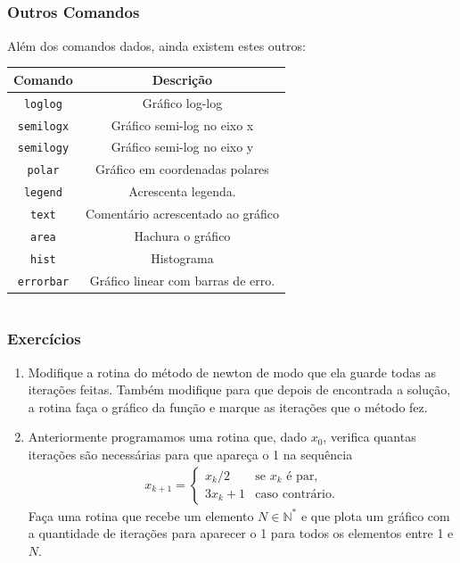 \documentclass{beamer}
\begin{document}
\subsection[Outros Comandos]{}
\begin{frame}
\frametitle{Outros Comandos}
Al\'em dos comandos dados, ainda existem estes outros:
\begin{center}
\begin{tabular}{|c|c|}
\hline
Comando & Descri\c{c}\~ao \\ \hline
{\tt loglog} & Gr\'afico log-log \\ \hline
{\tt semilogx} & Gr\'afico semi-log no eixo x \\ \hline
{\tt semilogy} & Gr\'afico semi-log no eixo y \\ \hline
{\tt polar} & Gr\'afico em coordenadas polares \\ \hline
{\tt legend} & Acrescenta legenda. \\ \hline
{\tt text} & Coment\'ario acrescentado ao gr\'afico \\ \hline
{\tt area} & Hachura o gr\'afico \\ \hline
{\tt hist} & Histograma \\ \hline
{\tt errorbar} & Gr\'afico linear com barras de erro. \\ \hline
\end{tabular}
\end{center}
\end{frame}

\section[Exerc\'icios]{}

\begin{frame}
\frametitle{Exerc\'icios}

\begin{enumerate}
 \item Modifique a rotina do m\'etodo de newton de modo que ela guarde todas as itera\c{c}\~oes feitas. Tamb\'em modifique para que depois de encontrada a solu\c{c}\~ao, a rotina fa\c{c}a o gr\'afico da fun\c{c}\~ao e marque as itera\c{c}\~oes que o m\'etodo fez.
 \item Anteriormente programamos uma rotina que, dado $x_0$, verifica quantas itera\c{c}\~oes s\~ao necess\'arias para que apare\c{c}a o 1 na sequ\^encia
 \begin{eqnarray*}
 x_{k+1} = \left\{
 \begin{array}{ll}
 x_k/2 & \mbox {se $x_k$ \'e par,} \\
 3x_k+1 & \mbox {caso contr\'ario.}
 \end{array}
 \right.
 \end{eqnarray*}
 Fa\c{c}a uma rotina que recebe um elemento $N \in \mathbb{N}^{*}$ e que plota um gr\'afico com a quantidade de itera\c{c}\~oes para aparecer o 1 para todos os elementos entre 1 e $N$.
\end{enumerate}

\end{frame}
\end{document}
